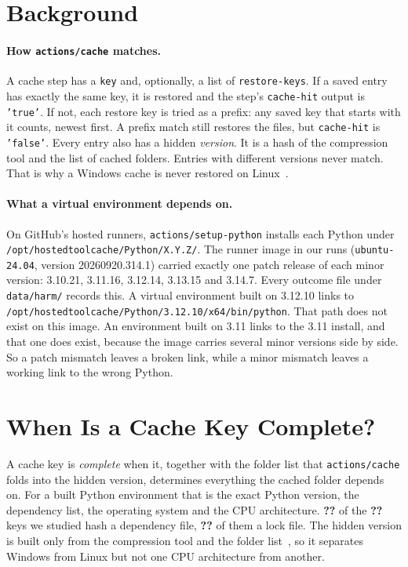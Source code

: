\documentclass[10pt,a4paper]{article}
\newcommand{\ck}[1]{\textbf{??}}\newcommand{\repourl}{\url{https://github.com/mark124/cache-key-soundness}}%
\begin{document}
\section{Background}
\label{sec:bg}

\paragraph{How \texttt{actions/cache} matches.}
A cache step has a \texttt{key} and, optionally, a list of
\texttt{restore-keys}. If a saved entry has exactly the same key, it is restored
and the step's \texttt{cache-hit} output is \texttt{'true'}. If not, each
restore key is tried as a prefix: any saved key that starts with it counts,
newest first. A prefix match still restores the files, but
\texttt{cache-hit} is \texttt{'false'}. Every entry also has a hidden
\emph{version}. It is a hash of the compression tool and the list of cached
folders. Entries with different versions never match. That is why a Windows
cache is never restored on Linux~\cite{actionscache}.

\paragraph{What a virtual environment depends on.}
On GitHub's hosted runners, \texttt{actions/setup-python} installs each Python
under \texttt{/opt/hostedtoolcache/Python/X.Y.Z/}. The runner image in our
runs (\texttt{ubuntu-24.04}, version 20260920.314.1) carried exactly one patch
release of each minor version: 3.10.21, 3.11.16, 3.12.14, 3.13.15 and 3.14.7.
Every outcome file under \texttt{data/harm/} records this. A virtual
environment built on 3.12.10 links to
\texttt{/opt/hostedtoolcache/Python/3.12.10/x64/bin/python}. That path does not
exist on this image. An environment built on 3.11 links to the 3.11 install,
and that one does exist, because the image carries several minor versions side
by side. So a patch mismatch leaves a broken link, while a minor mismatch
leaves a working link to the wrong Python.

\section{When Is a Cache Key Complete?}
\label{sec:sound}

A cache key is \emph{complete} when it, together with the folder list that
\texttt{actions/cache} folds into the hidden version, determines everything
the cached folder depends on. For a built Python environment that is the exact
Python version, the dependency list, the operating system and the CPU
architecture. \ck{h.built_with_deps_hash} of the \ck{h.built_env_steps} keys
we studied hash a dependency file, \ck{h.built_hashing_lock_file} of them a
lock file. The hidden version is built only from the compression tool and the
folder list~\cite{actionscache}, so it separates Windows from Linux but not
one CPU architecture from another.
\end{document}
